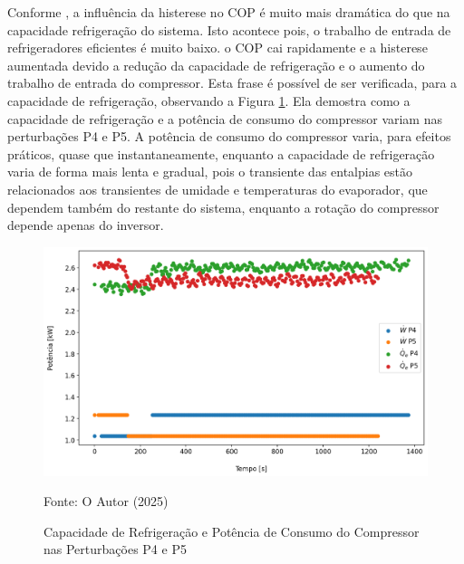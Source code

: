 Conforme \textcite{MASCHE2021302}, a influência da histerese no COP é muito mais dramática do que na capacidade refrigeração do sistema. Isto acontece pois, o trabalho de entrada de refrigeradores eficientes é muito baixo. o COP cai rapidamente e a histerese aumentada devido a redução da capacidade de refrigeração e o aumento do trabalho de entrada do compressor. Esta frase é possível de ser verificada, para a capacidade de refrigeração, observando a Figura \ref{fig:Capacidade de Resfriamento e Potência de Entrada do Compressor P4 e P5}. Ela demostra como a capacidade de refrigeração e a potência de consumo do compressor variam nas perturbações P4 e P5. A potência de consumo do compressor varia, para efeitos práticos, quase que instantaneamente, enquanto a capacidade de refrigeração varia de forma mais lenta e gradual, pois o transiente das entalpias estão relacionados aos transientes de umidade e temperaturas do evaporador, que dependem também do restante do sistema, enquanto a rotação do compressor depende apenas do inversor.
\newpage
\begin{figure}[h]
    \centering
    \includegraphics[width=1\linewidth]{FigurasdoTexto/Qe e W Histerese.png}
    \caption{Capacidade de Refrigeração e Potência de Consumo do Compressor nas Perturbações P4 e P5}
    \label{fig:Capacidade de Resfriamento e Potência de Entrada do Compressor P4 e P5}
    {\footnotesize Fonte: O Autor (2025)}
\end{figure}

